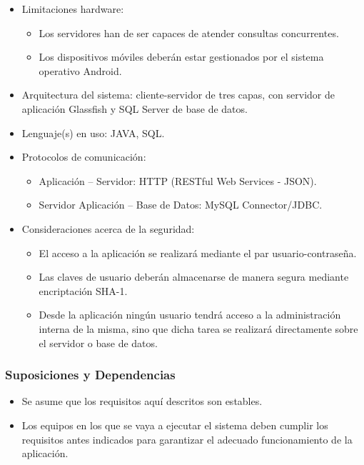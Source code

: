 \begin{itemize}	
	\item Limitaciones hardware:
	\begin{itemize}
		\item Los servidores han de ser capaces de atender consultas concurrentes.
		\item Los dispositivos móviles deberán estar gestionados por el sistema operativo Android.
	\end{itemize}
	\item Arquitectura del sistema: cliente-servidor de tres capas, con servidor de aplicación Glassfish y SQL Server de base de datos.
	\item Lenguaje(s) en uso: JAVA, SQL.
	\item Protocolos de comunicación: 
	\begin{itemize}
		\item Aplicación -- Servidor: HTTP (RESTful Web Services - JSON).
		\item Servidor Aplicación -- Base de Datos: MySQL Connector/JDBC.
	\end{itemize}
	\item Consideraciones acerca de la seguridad:
	\begin{itemize}
		\item El acceso a la aplicación se realizará mediante el par usuario-contraseña.
		\item Las claves de usuario deberán almacenarse de manera segura mediante encriptación SHA-1.
		\item Desde la aplicación ningún usuario tendrá acceso a la administración interna de la misma, sino que dicha tarea se realizará directamente sobre el servidor o base de datos.
	\end{itemize}
\end{itemize}

\subsubsection{Suposiciones y Dependencias}

\begin{itemize}	
	\item Se asume que los requisitos aquí descritos son estables.
	\item Los equipos en los que se vaya a ejecutar el sistema deben cumplir los requisitos antes indicados para garantizar el adecuado funcionamiento de la aplicación.
\end{itemize}

